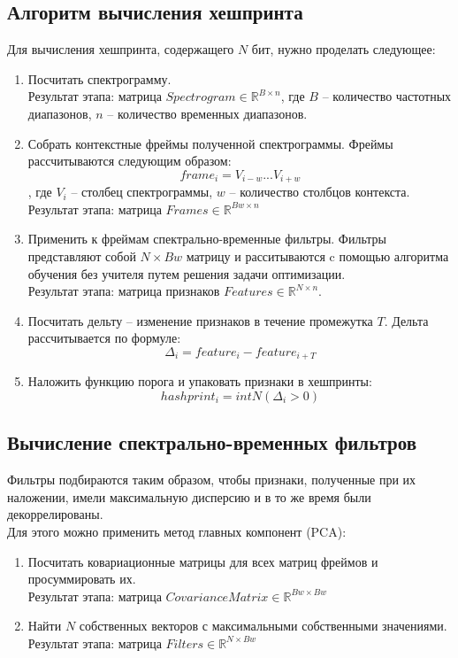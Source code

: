 \subsection{Алгоритм вычисления хешпринта}
Для вычисления хешпринта, содержащего $N$ бит, нужно проделать следующее:
\begin{enumerate}[label=\arabic*.]
    \item Посчитать спектрограмму.\\
    Результат этапа: матрица $Spectrogram \in \mathbb{R}^{B \times n}$, где $B$ -- количество частотных диапазонов,
    $n$ -- количество временных диапазонов.
    \item Собрать контекстные фреймы полученной спектрограммы.
    Фреймы рассчитываются следующим образом:
    $$frame_i = V_{i-w}...V_{i+w}$$, где $V_i$ -- столбец спектрограммы, $w$ -- количество столбцов контекста.\\
    Результат этапа: матрица $Frames \in \mathbb{R}^{Bw \times n}$
    \item Применить к фреймам спектрально-временные фильтры. Фильтры представляют собой
    $N \times Bw$ матрицу и расситываются c помощью алгоритма обучения без учителя
    путем решения задачи оптимизации.\\
    Результат этапа: матрица признаков $Features \in \mathbb{R}^{N \times n}$.
    \item Посчитать дельту -- изменение признаков в течение промежутка $T$.
    Дельта рассчитывается по формуле:
    $$\Delta_i = feature_i - feature_{i+T}$$
    \item Наложить функцию порога и упаковать признаки в хешпринты:
    $$hashprint_i = intN(\Delta_i > 0)$$
\end{enumerate}

\subsection{Вычисление спектрально-временных фильтров}
Фильтры подбираются таким образом, чтобы признаки, полученные при их наложении,
имели максимальную дисперсию и в то же время были декоррелированы.\\
Для этого можно применить метод главных компонент (PCA):
\begin{enumerate}[label=\arabic*.]
    \item Посчитать ковариационные матрицы для всех матриц фреймов
    и просуммировать их.\\
    Результат этапа: матрица $CovarianceMatrix \in \mathbb{R}^{Bw \times Bw}$
    \item Найти $N$ собственных векторов с максимальными собственными значениями.\\
    Результат этапа: матрица $Filters \in \mathbb{R}^{N \times Bw}$
\end{enumerate}

